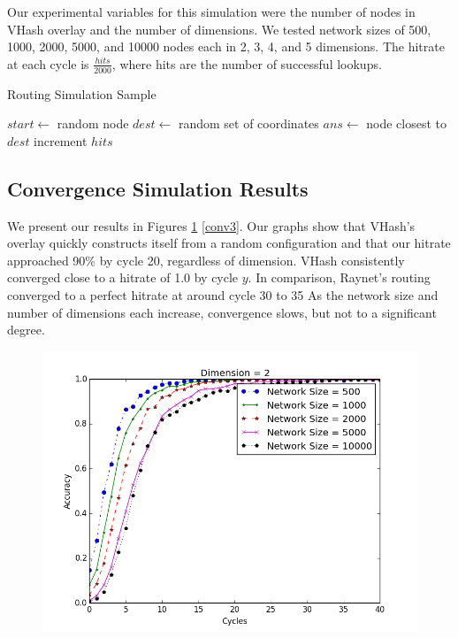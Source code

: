 \documentclass{IEEEtran}
\begin{document}
Our experimental variables for this simulation were the number of nodes in VHash overlay and the number of dimensions.  
We tested network sizes of 500, 1000, 2000, 5000, and 10000 nodes each in 2, 3, 4, and 5 dimensions.
The hitrate at each cycle is $\frac{hits}{2000}$, where hits are the number of successful lookups.

 


\begin{algorithm}
\caption{Routing Simulation Sample}
\label{routesim}
\begin{algorithmic}[1]  %
	\STATE $start \leftarrow$ random node
	\STATE $dest \leftarrow$ random set of coordinates
    \STATE $ans \leftarrow$ node closest to $dest$
    	\STATE increment $hits$
    \ENDIF
\end{algorithmic} 
\end{algorithm}



\subsection{Convergence Simulation Results}
We present our results in Figures \ref{conv2} \ref{conv3}.
Our graphs show that VHash's overlay quickly constructs itself from a random configuration and that our hitrate approached 90\% by cycle 20, regardless of dimension.
VHash consistently converged close to a hitrate of 1.0 by cycle $y$. 
In comparison, Raynet's routing converged to a perfect hitrate at around cycle 30 to 35 \cite{raynet} 
As the network size and number of dimensions each increase, convergence slows, but not to a significant degree.


\begin{figure}
	\centering
	\includegraphics[width=\linewidth]{conv_d2}
	\caption{}
	\label{conv2}
\end{figure}
\end{document}
